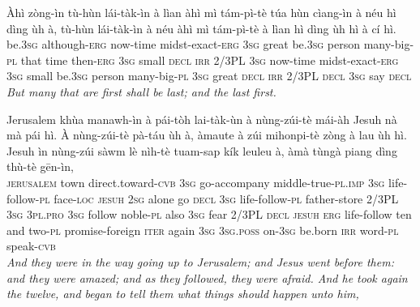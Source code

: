 \documentclass[11pt,a4paper]{article}
\begin{document}
\begin{exe}
\gll Àhì zòng-ìn tù-hùn lái-tàk-ìn à lìan àhì mì tám-pì-tè túa hùn cìang-ìn à néu hì dìng ùh à, tù-hùn lái-tàk-ìn à néu àhì mì tám-pì-tè à lìan hì dìng ùh hì à cí hì. \\
     be.\textsc{3sg} although-\textsc{erg} now-time midst-exact-\textsc{erg} \textsc{3sg} great be.\textsc{3sg} person many-big-\textsc{pl} that time then-\textsc{erg} \textsc{3sg} small \textsc{decl} \textsc{irr} 2/3PL \textsc{3sg} now-time midst-exact-\textsc{erg} \textsc{3sg} small be.\textsc{3sg} person many-big-\textsc{pl} \textsc{3sg} great \textsc{decl} \textsc{irr} 2/3PL \textsc{decl} \textsc{3sg} say \textsc{decl} \\
\glt \textcolor{kjvcolor}{\textit{But many that are first shall be last; and the last first.}}

\gll Jerusalem khùa manawh-ìn à pái-tòh lai-tàk-ùn à nùng-zúi-tè mái-àh Jesuh nà mà pái hì. À nùng-zúi-tè pà-táu ùh à, àmaute à zúi mihonpi-tè zòng à lau ùh hì. Jesuh ìn nùng-zúi sàwm lè nìh-tè tuam-sap kík leuleu à, àmà tùngà piang dìng thù-tè gēn-ìn, \\
     \textsc{jerusalem} town direct.toward-\textsc{cvb} \textsc{3sg} go-accompany middle-true-\textsc{pl}.\textsc{imp} \textsc{3sg} life-follow-\textsc{pl} face-\textsc{loc} \textsc{jesuh} \textsc{2sg} alone go \textsc{decl} \textsc{3sg} life-follow-\textsc{pl} father-store 2/3PL \textsc{3sg} \textsc{3pl}.\textsc{pro} \textsc{3sg} follow noble-\textsc{pl} also \textsc{3sg} fear 2/3PL \textsc{decl} \textsc{jesuh} \textsc{erg} life-follow ten and two-\textsc{pl} promise-foreign \textsc{iter} again \textsc{3sg} \textsc{3sg}.\textsc{poss} on-\textsc{3sg} be.born \textsc{irr} word-\textsc{pl} speak-\textsc{cvb} \\
\glt \textcolor{kjvcolor}{\textit{And they were in the way going up to Jerusalem; and Jesus went before them: and they were amazed; and as they followed, they were afraid. And he took again the twelve, and began to tell them what things should happen unto him,}}


\end{exe}
\end{document}
